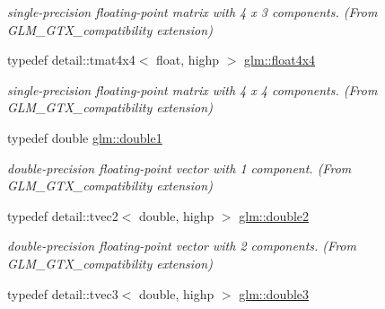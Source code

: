 \begin{DoxyCompactItemize}
\begin{DoxyCompactList}\small\item\em single-\/precision floating-\/point matrix with 4 x 3 components. (From G\+L\+M\+\_\+\+G\+T\+X\+\_\+compatibility extension) \end{DoxyCompactList}\item 
typedef detail\+::tmat4x4$<$ float, highp $>$ \hyperlink{group__gtx__compatibility_ga1f48a19e35b3640cf3d509041f7a800b}{glm\+::float4x4}\hypertarget{group__gtx__compatibility_ga1f48a19e35b3640cf3d509041f7a800b}{}\label{group__gtx__compatibility_ga1f48a19e35b3640cf3d509041f7a800b}

\begin{DoxyCompactList}\small\item\em single-\/precision floating-\/point matrix with 4 x 4 components. (From G\+L\+M\+\_\+\+G\+T\+X\+\_\+compatibility extension) \end{DoxyCompactList}\item 
typedef double \hyperlink{group__gtx__compatibility_gab8b88350212cea916857cb2f49b8a29f}{glm\+::double1}\hypertarget{group__gtx__compatibility_gab8b88350212cea916857cb2f49b8a29f}{}\label{group__gtx__compatibility_gab8b88350212cea916857cb2f49b8a29f}

\begin{DoxyCompactList}\small\item\em double-\/precision floating-\/point vector with 1 component. (From G\+L\+M\+\_\+\+G\+T\+X\+\_\+compatibility extension) \end{DoxyCompactList}\item 
typedef detail\+::tvec2$<$ double, highp $>$ \hyperlink{group__gtx__compatibility_ga227d30a4fa630c9e3fb6c7ea87250c62}{glm\+::double2}\hypertarget{group__gtx__compatibility_ga227d30a4fa630c9e3fb6c7ea87250c62}{}\label{group__gtx__compatibility_ga227d30a4fa630c9e3fb6c7ea87250c62}

\begin{DoxyCompactList}\small\item\em double-\/precision floating-\/point vector with 2 components. (From G\+L\+M\+\_\+\+G\+T\+X\+\_\+compatibility extension) \end{DoxyCompactList}\item 
typedef detail\+::tvec3$<$ double, highp $>$ \hyperlink{group__gtx__compatibility_ga3b94d4a19ca0272cad6e025fc5150d06}{glm\+::double3}\hypertarget{group__gtx__compatibility_ga3b94d4a19ca0272cad6e025fc5150d06}{}\label{group__gtx__compatibility_ga3b94d4a19ca0272cad6e025fc5150d06}


\end{DoxyCompactItemize}
